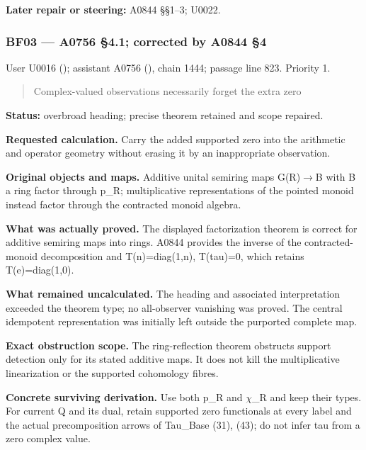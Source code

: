 \documentclass[10pt,a4paper,oneside]{report}
\begin{document}
\textbf{Later repair or steering:} A0844 §§1--3; U0022.

\subsubsection{BF03 --- A0756 §4.1; corrected by A0844
§4}\label{bf03-a0756-4.1-corrected-by-a0844-4}

User U0016 (\protect{});
assistant A0756 (\protect{}),
chain 1444; passage line 823. Priority 1.

\begin{quote}
Complex-valued observations necessarily forget the extra zero
\end{quote}

\textbf{Status:} overbroad heading; precise theorem retained and scope
repaired.

\textbf{Requested calculation.} Carry the added supported zero into the
arithmetic and operator geometry without erasing it by an inappropriate
observation.

\textbf{Original objects and maps.} Additive unital semiring maps
G(R)\allowbreak{}\ensuremath{→}\allowbreak{}B with B a ring factor
through p\_R; multiplicative representations of the pointed monoid
instead factor through the contracted monoid algebra.

\textbf{What was actually proved.} The displayed factorization theorem
is correct for additive semiring maps into rings. A0844 provides the
inverse of the contracted-monoid decomposition and T(n)=diag(1,n),
T(tau)=0, which retains T(e)=diag(1,0).

\textbf{What remained uncalculated.} The heading and associated
interpretation exceeded the theorem type; no all-observer vanishing was
proved. The central idempotent representation was initially left outside
the purported complete map.

\textbf{Exact obstruction scope.} The ring-reflection theorem obstructs
support detection only for its stated additive maps. It does not kill
the multiplicative linearization or the supported cohomology fibres.

\textbf{Concrete surviving derivation.} Use both p\_R and
\allowbreak{}\ensuremath{χ}\allowbreak{}\_R and keep their types. For
current Q and its dual, retain supported zero functionals at every label
and the actual precomposition arrows of Tau\_Base (31), (43); do not
infer tau from a zero complex value.
\end{document}
